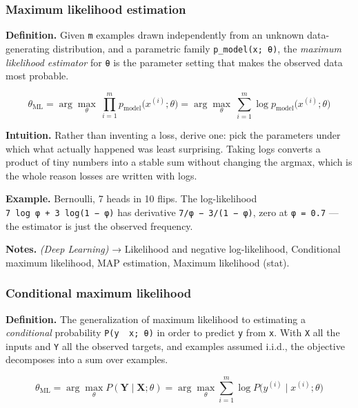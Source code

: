 \documentclass[
  10pt,
  letterpaper,
  onecolumn]{article}
\begin{document}
\hypertarget{maximum-likelihood-estimation}{%
\subsubsection{Maximum likelihood
estimation}\label{maximum-likelihood-estimation}}

\textbf{Definition.} Given \texttt{m} examples drawn independently from
an unknown data-generating distribution, and a parametric family
\texttt{p\_model(x;\ θ)}, the \emph{maximum likelihood estimator} for
\texttt{θ} is the parameter setting that makes the observed data most
probable.

\begin{equation*}
\theta_{\text{ML}}=\arg\max_{\theta}\ \prod_{i=1}^{m}p_{\text{model}}\bigl(x^{(i)};\theta\bigr)
=\arg\max_{\theta}\ \sum_{i=1}^{m}\log p_{\text{model}}\bigl(x^{(i)};\theta\bigr)
\end{equation*}

\textbf{Intuition.} Rather than inventing a loss, derive one: pick the
parameters under which what actually happened was least surprising.
Taking logs converts a product of tiny numbers into a stable sum without
changing the argmax, which is the whole reason losses are written with
logs.

\textbf{Example.} Bernoulli, 7 heads in 10 flips. The log-likelihood
\texttt{7\ log\ φ\ +\ 3\ log(1\ −\ φ)} has derivative
\texttt{7/φ\ −\ 3/(1\ −\ φ)}, zero at \texttt{φ\ =\ 0.7} --- the
estimator is just the observed frequency.

\textbf{Notes.} \emph{(Deep Learning)} → Likelihood and negative
log-likelihood, Conditional maximum likelihood, MAP estimation, Maximum
likelihood (stat).

\hypertarget{conditional-maximum-likelihood}{%
\subsubsection{Conditional maximum
likelihood}\label{conditional-maximum-likelihood}}

\textbf{Definition.} The generalization of maximum likelihood to
estimating a \emph{conditional} probability \texttt{P(y\ \textbar{}\ x;\ θ)}
in order to predict \texttt{y} from \texttt{x}. With \texttt{X} all the
inputs and \texttt{Y} all the observed targets, and examples assumed
i.i.d., the objective decomposes into a sum over examples.

\begin{equation*}
\theta_{\text{ML}}=\arg\max_{\theta} P(\mathbf{Y}\mid\mathbf{X};\theta)
=\arg\max_{\theta}\sum_{i=1}^{m}\log P\bigl(y^{(i)}\mid x^{(i)};\theta\bigr)
\end{equation*}
\end{document}
